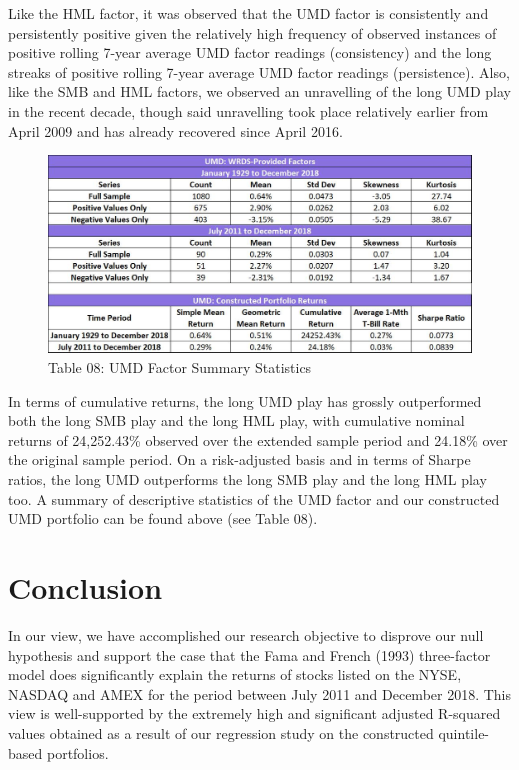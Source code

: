 \documentclass[12pt]{article}
\begin{document}
\noindent Like the HML factor, it was observed that the UMD factor is consistently and persistently positive given the relatively high frequency of observed instances of positive rolling 7-year average UMD factor readings (consistency) and the long streaks of positive rolling 7-year average UMD factor readings (persistence). Also, like the SMB and HML factors, we observed an unravelling of the long UMD play in the recent decade, though said unravelling took place relatively earlier from April 2009 and has already recovered since April 2016. 

\begin{figure}[h]
	\centering
	\includegraphics[width=0.8\linewidth]{UMD02}
	\caption*{Table 08: UMD Factor Summary Statistics}
	\label{fig:label}
\end{figure}

\noindent In terms of cumulative returns, the long UMD play has grossly outperformed both the long SMB play and the long HML play, with cumulative nominal returns of 24,252.43\% observed over the extended sample period and 24.18\% over the original sample period. On a risk-adjusted basis and in terms of Sharpe ratios, the long UMD outperforms the long SMB play and the long HML play too. A summary of descriptive statistics of the UMD factor and our constructed UMD portfolio can be found above (see Table 08).


	\section{Conclusion} %
	\noindent In our view, we have accomplished our research objective to disprove our null hypothesis and support the case that the Fama and French (1993) three-factor model does significantly explain the returns of stocks listed on the NYSE, NASDAQ and AMEX for the period between July 2011 and December 2018. This view is well-supported by the extremely high and significant adjusted R-squared values obtained as a result of our regression study on the constructed quintile-based portfolios.\\
	
\end{document}
